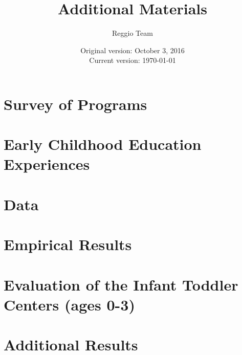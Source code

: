 






\title{\Large \textbf{Additional Materials}}
\author{\normalsize Reggio Team}
\date{\normalsize Original version: October 3, 2016 \\ Current version: \today}
\maketitle

\tableofcontents

\doublespacing

\begin{appendices}

\section{Survey of Programs}
\label{sec:survey}
 

\section{Early Childhood Education Experiences}
\label{sec:eceexperiences}


\section{Data}
\label{sec:data}


\section{Empirical Results}
\label{sec:results}


\section{Evaluation of the Infant Toddler Centers (ages 0-3)} \label{sec:ITC}


\section{Additional Results}
\label{sec:Appendix}


\end{appendices}





